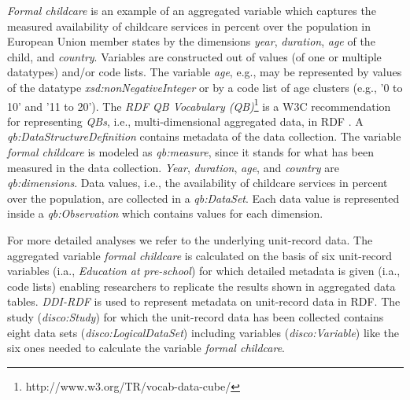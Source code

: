 \documentclass{llncs}
\newcommand{\ke}[1]{\todo[size=\small, color=orange!40]{\textbf{Kai:} #1}}
\newcommand{\tb}[1]{\todo[size=\small, color=green!40]{\textbf{Thomas:} #1}}
\begin{document}
\emph{Formal childcare} is an example of an aggregated variable which captures the measured availability of childcare services in percent over the population in European Union member states by 
the dimensions \emph{year}, \emph{duration}, \emph{age} of the child, and \emph{country}.
Variables are constructed out of values (of one or multiple datatypes) and/or code lists.
The variable \emph{age}, e.g., may be represented by values of the datatype \emph{xsd:nonNegativeInteger} or by a code list of age clusters (e.g., '0 to 10' and '11 to 20'). 
The \emph{RDF QB Vocabulary (QB)}\footnote{http://www.w3.org/TR/vocab-data-cube/} is a W3C recommendation for representing \emph{QBs}, i.e., multi-dimensional aggregated data, in RDF \cite{Cyganiak2010}. 
A \emph{qb:DataStructureDefinition} contains metadata of the data collection.
The variable \emph{formal childcare} is modeled as \emph{qb:measure}, since it stands for what has been measured in the data collection.
\emph{Year}, \emph{duration}, \emph{age}, and \emph{country} are \emph{qb:dimensions}.
Data values, i.e., the availability of childcare services in percent over the population, are collected in a \emph{qb:DataSet}. 
Each data value is represented inside a \emph{qb:Observation} which contains values for each dimension. 

For more detailed analyses we refer to the underlying unit-record data. The aggregated variable \emph{formal childcare} is calculated on the basis of six unit-record variables (i.a., \emph{Education at pre-school}) for which detailed metadata is given (i.a., code lists) enabling researchers to replicate the results shown in aggregated data tables.
\emph{DDI-RDF} is used to represent metadata on unit-record data in RDF.
The study (\emph{disco:Study}) for which the unit-record data has been collected 
contains eight data sets (\emph{disco:LogicalDataSet})
including variables (\emph{disco:Variable}) like the six ones needed to calculate the variable \emph{formal childcare}.
\end{document}
